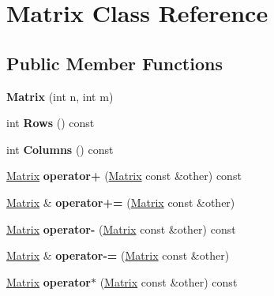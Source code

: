 \hypertarget{classMatrix}{}\section{Matrix Class Reference}
\label{classMatrix}
\subsection*{Public Member Functions}
\begin{DoxyCompactItemize}
\item 
\mbox{\label{classMatrix_ae157f910061b3e1155b17b62583bde57}} 
{\bfseries Matrix} (int n, int m)
\item 
\mbox{\label{classMatrix_a409518fdf191a193bf544e0148fdc9cc}} 
int {\bfseries Rows} () const
\item 
\mbox{\label{classMatrix_a742ff4cea157cd4d7a1943ddbc702028}} 
int {\bfseries Columns} () const
\item 
\mbox{\label{classMatrix_a2c888c6a7fe7a4ea3b603d17fe3f77e0}} 
\hyperlink{classMatrix}{Matrix} {\bfseries operator+} (\hyperlink{classMatrix}{Matrix} const \&other) const
\item 
\mbox{\label{classMatrix_a5f5d62f853a2ed97f2ba437036b1724d}} 
\hyperlink{classMatrix}{Matrix} \& {\bfseries operator+=} (\hyperlink{classMatrix}{Matrix} const \&other)
\item 
\mbox{\label{classMatrix_a5f7129af600c22b69abdcb2c3b204e5a}} 
\hyperlink{classMatrix}{Matrix} {\bfseries operator-\/} (\hyperlink{classMatrix}{Matrix} const \&other) const
\item 
\mbox{\label{classMatrix_a5871f028dc8b3ae8043a942b5840cdec}} 
\hyperlink{classMatrix}{Matrix} \& {\bfseries operator-\/=} (\hyperlink{classMatrix}{Matrix} const \&other)
\item 
\mbox{\label{classMatrix_a087f5fbe295229d2790871bb14b6a2a5}} 
\hyperlink{classMatrix}{Matrix} {\bfseries operator$\ast$} (\hyperlink{classMatrix}{Matrix} const \&other) const
\item 
\mbox{\label{classMatrix_a8d3c514ae15700397053fd3402552b1c}} 

\end{DoxyCompactItemize}
